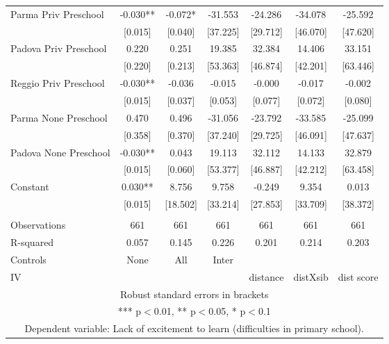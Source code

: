 \begin{tabular}{lcccccc}
Parma Priv Preschool & -0.030** & -0.072* & -31.553 & -24.286 & -34.078 & -25.592 \\
 & [0.015] & [0.040] & [37.225] & [29.712] & [46.070] & [47.620] \\
Padova Priv Preschool & 0.220 & 0.251 & 19.385 & 32.384 & 14.406 & 33.151 \\
 & [0.220] & [0.213] & [53.363] & [46.874] & [42.201] & [63.446] \\
Reggio Priv Preschool & -0.030** & -0.036 & -0.015 & -0.000 & -0.017 & -0.002 \\
 & [0.015] & [0.037] & [0.053] & [0.077] & [0.072] & [0.080] \\
Parma None Preschool & 0.470 & 0.496 & -31.056 & -23.792 & -33.585 & -25.099 \\
 & [0.358] & [0.370] & [37.240] & [29.725] & [46.091] & [47.637] \\
Padova None Preschool & -0.030** & 0.043 & 19.113 & 32.112 & 14.133 & 32.879 \\
 & [0.015] & [0.060] & [53.377] & [46.887] & [42.212] & [63.458] \\
Constant & 0.030** & 8.756 & 9.758 & -0.249 & 9.354 & 0.013 \\
 & [0.015] & [18.502] & [33.214] & [27.853] & [33.709] & [38.372] \\
 &  &  &  &  &  &  \\
Observations & 661 & 661 & 661 & 661 & 661 & 661 \\
R-squared & 0.057 & 0.145 & 0.226 & 0.201 & 0.214 & 0.203 \\
Controls & None & All & Inter &  &  &  \\
 IV &  &  &  & distance & distXsib & dist score \\ \hline
\multicolumn{7}{c}{ Robust standard errors in brackets} \\
\multicolumn{7}{c}{ *** p$<$0.01, ** p$<$0.05, * p$<$0.1} \\
\multicolumn{7}{c}{ Dependent variable: Lack of excitement to learn (difficulties in primary school).} \\
\end{tabular}
